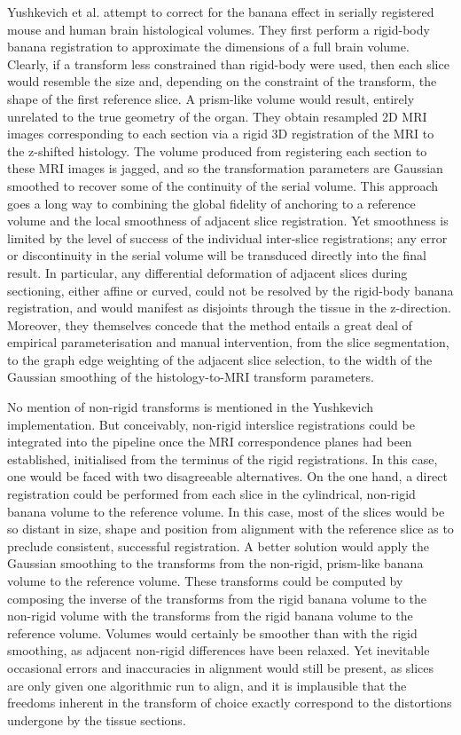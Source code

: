   Yushkevich et al. attempt to correct for the banana effect in serially registered mouse \cite{Yushkevich2006} and human \cite{Adler2012} brain histological volumes. They first perform a rigid-body banana registration to approximate the dimensions of a full brain volume. Clearly, if a transform less constrained than rigid-body were used, then each slice would resemble the size and, depending on the constraint of the transform, the shape of the first reference slice. A prism-like volume would result, entirely unrelated to the true geometry of the organ. They obtain resampled 2D MRI images corresponding to each section via a rigid 3D registration of the MRI to the z-shifted histology. The volume produced from registering each section to these MRI images is jagged, and so the transformation parameters are Gaussian smoothed to recover some of the continuity of the serial volume. This approach goes a long way to combining the global fidelity of anchoring to a reference volume and the local smoothness of adjacent slice registration. Yet smoothness is limited by the level of success of the individual inter-slice registrations; any error or discontinuity in the serial volume will be transduced directly into the final result. In particular, any differential deformation of adjacent slices during sectioning, either affine or curved, could not be resolved by the rigid-body banana registration, and would manifest as disjoints through the tissue in the z-direction. Moreover, they themselves concede that the method entails a great deal of empirical parameterisation and manual intervention, from the slice segmentation, to the graph edge weighting of the adjacent slice selection, to the width of the Gaussian smoothing of the histology-to-MRI transform parameters.
  
  No mention of non-rigid transforms is mentioned in the Yushkevich implementation. But conceivably, non-rigid interslice registrations could be integrated into the pipeline once the MRI correspondence planes had been established, initialised from the terminus of the rigid registrations. In this case, one would be faced with two disagreeable alternatives. On the one hand, a direct registration could be performed from each slice in the cylindrical, non-rigid banana volume to the reference volume. In this case, most of the slices would be so distant in size, shape and position from alignment with the reference slice as to preclude consistent, successful registration. A better solution would apply the Gaussian smoothing to the transforms from the non-rigid, prism-like banana volume to the reference volume. These transforms could be computed by composing the inverse of the transforms from the rigid banana volume to the non-rigid volume with the transforms from the rigid banana volume to the reference volume. Volumes would certainly be smoother than with the rigid smoothing, as adjacent non-rigid differences have been relaxed. Yet inevitable occasional errors and inaccuracies in alignment would still be present, as slices are only given one algorithmic run to align, and it is implausible that the freedoms inherent in the transform of choice exactly correspond to the distortions undergone by the tissue sections.
  
